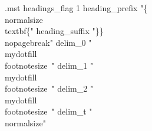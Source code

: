 \AtBeginDocument{%
\renewcommand{\chapterautorefname}{Chap.}
\renewcommand{\sectionautorefname}{Sect.}
\renewcommand{\subsectionautorefname}{Sect.}
\renewcommand{\subsubsectionautorefname}{Sect.}
\renewcommand{\theoremautorefname}{Thm.}
\newcommand{\definitionautorefname}{Def.}
\newcommand{\exampleautorefname}{Ex.}
\renewcommand{\figureautorefname}{Fig.}
\newcommand{\algorithmautorefname}{Algorithm}
\newcommand{\notationautorefname}{Notation}
}


\algrenewcommand{}

\DeclareRobustCommand\mydotfill{%
\leavevmode
\cleaders \hbox to.44em{\hss.\hss}\hskip 1.32em plus 1fill
\kern0pt }

\makeatletter
\renewenvironment{theindex}
{{\chapter{\indexname}\label{sec:app:index}}\par%
\@mkboth{\MakeUppercase\indexname}{\MakeUppercase\indexname}%
\parindent\z@
\parskip\z@ \@plus .5\p@\relax
\let\item\@idxitem
\setlength{\columnsep}{20pt}
\setlength{\parindent}{0em}
\begin{multicols*}{2}\raggedcolumns}
{\end{multicols*}}
\renewcommand{\@idxitem}{\par\hangindent 21\p@}
\makeatother

\begin{filecontents}{\jobname.mst}
headings_flag 1
heading_prefix "\{\\normalsize\\textbf\{"
heading_suffix "\}\}\\nopagebreak\n"
delim_0 " \\mydotfill \\footnotesize~"
delim_1 " \\mydotfill \\footnotesize~"
delim_2 " \\mydotfill \\footnotesize~"
delim_t "\\normalsize"
\end{filecontents}

